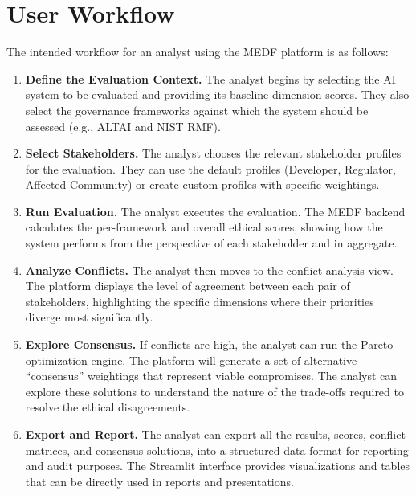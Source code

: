 \section{User Workflow}
\label{sec:workflow}

The intended workflow for an analyst using the MEDF platform is as follows:

\begin{enumerate}[leftmargin=2em]
  \item \textbf{Define the Evaluation Context.} The analyst begins by selecting the AI system to be evaluated and providing its baseline dimension scores. They also select the governance frameworks against which the system should be assessed (e.g., ALTAI and NIST RMF).

  \item \textbf{Select Stakeholders.} The analyst chooses the relevant stakeholder profiles for the evaluation. They can use the default profiles (Developer, Regulator, Affected Community) or create custom profiles with specific weightings.

  \item \textbf{Run Evaluation.} The analyst executes the evaluation. The MEDF backend calculates the per-framework and overall ethical scores, showing how the system performs from the perspective of each stakeholder and in aggregate.

  \item \textbf{Analyze Conflicts.} The analyst then moves to the conflict analysis view. The platform displays the level of agreement between each pair of stakeholders, highlighting the specific dimensions where their priorities diverge most significantly.

  \item \textbf{Explore Consensus.} If conflicts are high, the analyst can run the Pareto optimization engine. The platform will generate a set of alternative \enquote{consensus} weightings that represent viable compromises. The analyst can explore these solutions to understand the nature of the trade-offs required to resolve the ethical disagreements.

  \item \textbf{Export and Report.} The analyst can export all the results, scores, conflict matrices, and consensus solutions, into a structured data format for reporting and audit purposes. The Streamlit interface provides visualizations and tables that can be directly used in reports and presentations.
\end{enumerate}

